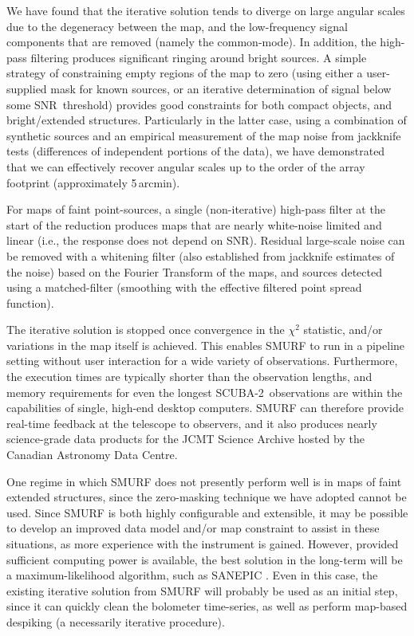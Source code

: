 \documentclass[useAMS,usenatbib,nofootinbib]{mn2e}
\newcommand{\snr}{SNR}
\newcommand{\scuba}{SCUBA-2}
\begin{document}
We have found that the iterative solution tends to diverge on large
angular scales due to the degeneracy between the map, and the
low-frequency signal components that are removed (namely the
common-mode). In addition, the high-pass filtering produces
significant ringing around bright sources. A simple strategy of
constraining empty regions of the map to zero (using either a
user-supplied mask for known sources, or an iterative determination of
signal below some \snr\ threshold) provides good constraints for both
compact objects, and bright/extended structures. Particularly in the
latter case, using a combination of synthetic sources and an empirical
measurement of the map noise from jackknife tests (differences of
independent portions of the data), we have demonstrated that we can
effectively recover angular scales up to the order of the array
footprint (approximately 5\,arcmin).

For maps of faint point-sources, a single (non-iterative) high-pass
filter at the start of the reduction produces maps that are nearly
white-noise limited and linear (i.e., the response does not depend on
\snr). Residual large-scale noise can be removed with a whitening
filter (also established from jackknife estimates of the noise) based
on the Fourier Transform of the maps, and sources detected using a
matched-filter (smoothing with the effective filtered point spread
function).

The iterative solution is stopped once convergence in the $\chi^2$
statistic, and/or variations in the map itself is achieved. This
enables SMURF to run in a pipeline setting without user interaction
for a wide variety of observations. Furthermore, the execution times
are typically shorter than the observation lengths, and memory
requirements for even the longest \scuba\ observations are within the
capabilities of single, high-end desktop computers. SMURF can
therefore provide real-time feedback at the telescope to observers,
and it also produces nearly science-grade data products for the JCMT
Science Archive hosted by the Canadian Astronomy Data Centre.

One regime in which SMURF does not presently perform well is in maps
of faint extended structures, since the zero-masking technique we have
adopted cannot be used. Since SMURF is both highly configurable and
extensible, it may be possible to develop an improved data model
and/or map constraint to assist in these situations, as more
experience with the instrument is gained. However, provided sufficient
computing power is available, the best solution in the long-term will
be a maximum-likelihood algorithm, such as SANEPIC
\citep{patanchon2008}. Even in this case, the existing iterative
solution from SMURF will probably be used as an initial step, since it
can quickly clean the bolometer time-series, as well as perform
map-based despiking (a necessarily iterative procedure).
\end{document}

